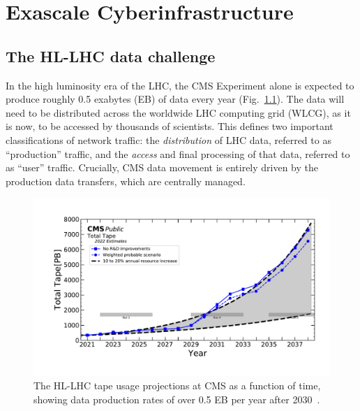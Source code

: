 \chapter{Exascale Cyberinfrastructure}\label{ch:cyber}

\section{The HL-LHC data challenge}
In the high luminosity era of the LHC, the CMS Experiment alone is expected to produce roughly 0.5 exabytes (EB) of data every year\footnotemark{} (Fig.~\ref{fig:tape_projections}). 
The data will need to be distributed across the worldwide LHC computing grid (WLCG), as it is now, to be accessed by thousands of scientists. 
This defines two important classifications of network traffic: the \textit{distribution} of LHC data, referred to as ``production'' traffic, and the \textit{access} and final processing of that data, referred to as ``user'' traffic. 
Crucially, CMS data movement is entirely driven by the production data transfers, which are centrally managed. 

\begin{figure}[htb]
    \centering
    \includegraphics[width=.9\textwidth]{fig/cyber/tape_cms2022.pdf}
    \caption[HL-LHC tape usage projections at CMS]{
        The HL-LHC tape usage projections at CMS as a function of time, showing data production rates of over 0.5 EB per year after 2030~\cite{CMSComputingReport2022}.
    }
    \label{fig:tape_projections}
\end{figure}

